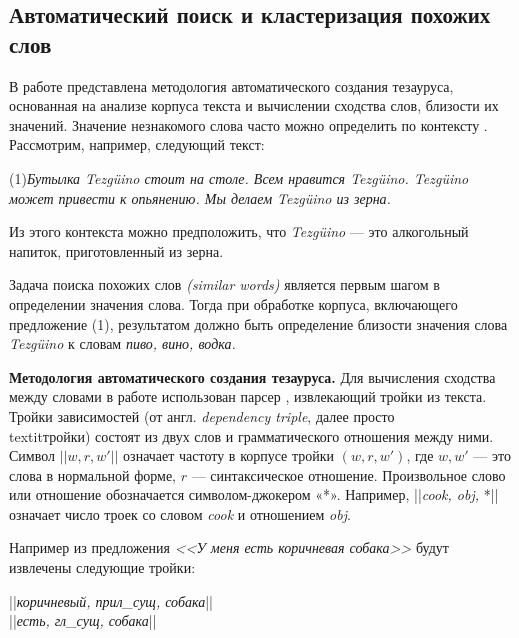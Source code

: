 \documentclass{article}
\begin{document}
\begin{articletext}
\section{Автоматический поиск и кластеризация похожих слов}

\begin{flushright}
\end{flushright}

В работе \cite{Dekang 1998} представлена методология автоматического создания тезауруса, основанная на анализе корпуса текста и вычислении сходства слов, близости их значений. Значение незнакомого слова часто можно определить по контексту \cite{Eugene 1975}.  Рассмотрим, например, следующий текст:
\begin{flushright}
(1)\textit{Бутылка Tezg\"uino стоит на столе. Всем нравится Tezg\"uino. Tezg\"uino может привести к опьянению. Мы делаем Tezg\"uino из зерна.} 
\end{flushright}

Из этого контекста можно предположить, что \textit{Tezg\"uino} --- это алкогольный напиток, приготовленный из зерна.

Задача поиска похожих слов \textit{(similar words)} является первым шагом в определении значения слова. Тогда при обработке корпуса, включающего предложение (1), результатом должно быть определение близости значения слова \textit{Tezg\"uino} к словам \textit{пиво, вино, водка.}

\textbf{Методология автоматического создания тезауруса.} Для вычисления сходства между словами в работе \cite{Dekang 1998} использован парсер \cite{Dekang 1993}, извлекающий тройки из текста. Тройки зависимостей (от англ. \textit{dependency triple}, далее просто \\textit{тройки}) состоят из двух слов и грамматического отношения между ними. Символ $||w, r, w'||$ означает частоту в корпусе тройки $(w, r, w')$, где $w, w'$ --- это слова в нормальной форме, $r$ --- синтаксическое отношение. Произвольное слово или отношение обозначается символом-джокером «*». Например, ||\textit{cook, obj,} *|| означает число троек со словом \textit{cook} и отношением \textit{obj}. 

Например из предложения \textit{<<У меня есть коричневая собака>>} будут извлечены следующие тройки:

\begin{center}
||\textit{коричневый, прил\_сущ, собака}||\\
||\textit{есть, гл\_сущ, собака}|| 
\end{center}


\end{articletext}
\end{document}
